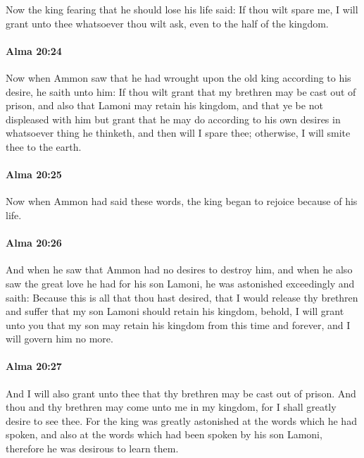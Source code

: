 			Now the king fearing that he should lose his life said:
			If thou wilt spare me,
			I will grant unto thee whatsoever thou wilt ask,
			even to the half of the kingdom.

		\paragraph{Alma 20:24} %
			\label{ALMA-20-24}

			Now when Ammon saw
			that he had wrought upon the old king according to his desire,
			he saith unto him:
			If thou wilt grant that my brethren may be cast out of prison,
			and also that Lamoni may retain his kingdom,
			and that ye be not displeased with him
			but grant that he may do according to his own desires
			in whatsoever thing he thinketh,
			and then will I spare thee;
			otherwise, I will smite thee to the earth.

		\paragraph{Alma 20:25} %
			\label{ALMA-20-25}

			Now when Ammon had said these words,
			the king began to rejoice because of his life.

		\paragraph{Alma 20:26} %
			\label{ALMA-20-26}

			And when he saw that Ammon had no desires to destroy him,
			and when he also saw the great love he had for his son Lamoni,
			he was astonished exceedingly and saith:
			Because this is all that thou hast desired,
			that I would release thy brethren
			and suffer that my son Lamoni should retain his kingdom,
			behold, I will grant unto you
			that my son may retain his kingdom from this time and forever,
			and I will govern him no more.

		\paragraph{Alma 20:27} %
			\label{ALMA-20-27}

			And I will also grant unto thee that thy brethren may be cast out of prison.
			And thou and thy brethren may come unto me in my kingdom,
			for I shall greatly desire to see thee.
			For the king was greatly astonished at the words which he had spoken,
			and also at the words which had been spoken by his son Lamoni,
			therefore he was desirous to learn them.

